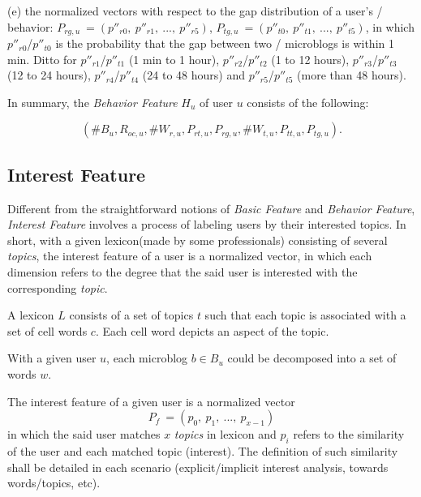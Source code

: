 \sstab(e) the normalized vectors with respect to the gap distribution of a user's \retg{}/\twg{} behavior: $P_{rg,u}\ = (p''_{r0},\ p''_{r1},\ ...,\ p''_{r5})$, $P_{tg,u}\ = (p''_{t0},\ p''_{t1},\ ...,\ p''_{t5})$, in which $p''_{r0}$/$p''_{t0}$ is the probability that the gap between two \retd{}/\twg{} microblogs is within 1 min. Ditto for $p''_{r1}$/$p''_{t1}$ (1 min to 1 hour), $p''_{r2}$/$p''_{t2}$ (1 to 12 hours), $p''_{r3}$/$p''_{t3}$ (12 to 24 hours), $p''_{r4}$/$p''_{t4}$ (24 to 48 hours) and  $p''_{r5}$/$p''_{t5}$ (more than 48 hours).


In summary, the \textit{Behavior Feature} $H_u$ of user $u$ consists of the following:

\begin{equation}
\label{eq:beha}
(\#B_u, R_{oc,u}, \#W_{r,u}, P_{rt,u}, P_{rg,u}, \#W_{t,u}, P_{tt,u}, P_{tg,u}).
\end{equation}



\subsection{Interest Feature}

Different from the straightforward notions of \textit{Basic Feature} and \textit{Behavior Feature}, \textit{Interest Feature} involves a process of labeling users by their interested topics.
In short, with a given lexicon(made by some professionals) consisting of several \textit{topics}, the interest feature of a user is a normalized vector, in which each dimension refers to the degree that the said user is interested with the corresponding \textit{topic}.

\begin{definition}
\label{def:lexi}
A lexicon $L$ consists of a set of topics $t$ such that each topic is associated with a set of cell words $c$. Each cell word depicts an aspect of the topic.
\end{definition}

\begin{definition}
\label{def:bw}
With a given user $u$, each microblog $b \in B_u$ could be decomposed into a set of words $w$.
\end{definition}

\begin{definition}
\label{def:inte}
The interest feature of a given user is a normalized vector
\begin{equation}
\label{eq:inte}
P_f\ = (p_0,\ p_1,\ ...,\ p_{x-1})
\end{equation}
in which the said user matches $x$ \textit{topics} in lexicon and $p_i$ refers to the similarity of the user and each matched topic (interest). The definition of such similarity shall be detailed in each scenario (explicit/implicit interest analysis, towards words/topics, etc).
\end{definition}


